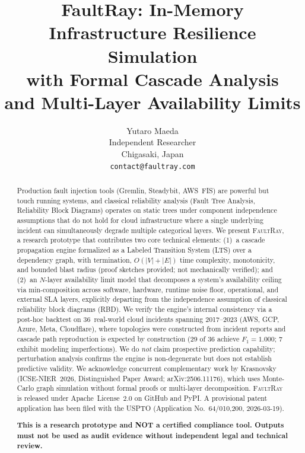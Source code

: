 \documentclass[10pt,twocolumn]{article}
\title{FaultRay: In-Memory Infrastructure Resilience Simulation\\with Formal Cascade Analysis\\and Multi-Layer Availability Limits}
\author{
  Yutaro Maeda\\
  Independent Researcher\\
  Chigasaki, Japan\\
  \texttt{contact@faultray.com}
}
\date{}
\begin{document}
\maketitle

\begin{abstract}
Production fault injection tools (Gremlin, Steadybit, AWS~FIS) are
powerful but touch running systems, and classical reliability
analysis (Fault Tree Analysis, Reliability Block Diagrams) operates
on static trees under component independence assumptions that do
not hold for cloud infrastructure where a single underlying
incident can simultaneously degrade multiple categorical layers.
We present \textsc{FaultRay}, a research prototype that contributes
two core technical elements:
(1)~a cascade propagation engine formalized as a Labeled Transition
System (LTS) over a dependency graph, with termination,
$O(|V|+|E|)$ time complexity, monotonicity, and bounded blast radius
(proof sketches provided; not mechanically verified);
and (2)~an $N$-layer availability limit model that decomposes a
system's availability ceiling via min-composition across software,
hardware, runtime noise floor, operational, and external SLA layers,
explicitly departing from the independence assumption of classical
reliability block diagrams (RBD).
We verify the engine's internal consistency via a post-hoc backtest
on 36~real-world cloud incidents spanning 2017--2023 (AWS, GCP,
Azure, Meta, Cloudflare), where topologies were constructed from
incident reports and cascade path reproduction is expected by
construction (29 of 36 achieve $F_1 = 1.000$; 7 exhibit modeling
imperfections). We do \emph{not} claim prospective prediction
capability; perturbation analysis confirms the engine is
non-degenerate but does not establish predictive validity.
We acknowledge concurrent complementary work by Krasnovsky
(ICSE-NIER~2026, Distinguished Paper Award; arXiv:2506.11176), which uses Monte-Carlo graph
simulation without formal proofs or multi-layer decomposition.
\textsc{FaultRay} is released under Apache~License~2.0 on GitHub
and PyPI. A provisional patent application has been filed with the
USPTO (Application No.\ 64/010,200, 2026-03-19).

\textbf{This is a research prototype and NOT a certified compliance
tool. Outputs must not be used as audit evidence without independent
legal and technical review.}
\end{abstract}
\end{document}
